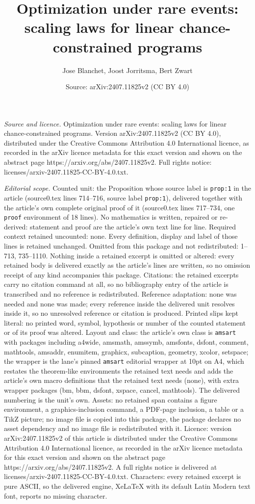 \documentclass[10pt,a4paper]{amsart}
\title[Optimization under rare events: scaling laws for linear chan]{Optimization under rare events: scaling laws for linear chance-constrained programs}
\author{Jose Blanchet, Joost Jorritsma, Bert Zwart}
\date{Source: arXiv:2407.11825v2 (CC BY 4.0)}
\begin{document}
\maketitle

\noindent\emph{Source and licence.} Optimization under rare events: scaling laws for linear chance-constrained programs. Version arXiv:2407.11825v2 (CC BY 4.0), distributed under the Creative Commons Attribution 4.0 International licence, as recorded in the arXiv licence metadata for this exact version and shown on the abstract page https://arxiv.org/abs/2407.11825v2. Full rights notice: licenses/arxiv-2407.11825-CC-BY-4.0.txt.\par\smallskip

\noindent\textit{Editorial scope.} Counted unit: the Proposition whose source label is \texttt{prop:1} in the article (source0.tex lines 714--716, source label \texttt{prop:1}), delivered together with the article's own complete original proof of it (source0.tex lines 717--734, one \texttt{proof} environment of 18 lines). No mathematics is written, repaired or re-derived: statement and proof are the article's own text line for line. Required context retained uncounted: none. Every definition, display and label of those lines is retained unchanged. Omitted from this package and not redistributed: 1--713, 735--1110. Nothing inside a retained excerpt is omitted or altered: every retained body is delivered exactly as the article's lines are written, so no omission receipt of any kind accompanies this package. Citations: the retained excerpts carry no citation command at all, so no bibliography entry of the article is transcribed and no reference is redistributed. Reference adaptation: none was needed and none was made; every reference inside the delivered unit resolves inside it, so no unresolved reference or citation is produced. Printed slips kept literal: no printed word, symbol, hypothesis or number of the counted statement or of its proof was altered. Layout and class: the article's own class is \texttt{amsart} with packages including a4wide, amsmath, amssymb, amsfonts, dsfont, comment, mathtools, amsaddr, enumitem, graphicx, subcaption, geometry, xcolor, setspace; the wrapper is the lane's pinned \texttt{amsart} editorial wrapper at 10pt on A4, which restates the theorem-like environments the retained text needs and adds the article's own macro definitions that the retained text needs (none), with extra wrapper packages (bm, bbm, dsfont, xspace, cancel, mathtools). The delivered numbering is the unit's own. Assets: no retained span contains a figure environment, a graphics-inclusion command, a PDF-page inclusion, a table or a TikZ picture; no image file is copied into this package, the package declares no asset dependency and no image file is redistributed with it. Licence: version arXiv:2407.11825v2 of this article is distributed under the Creative Commons Attribution 4.0 International licence, as recorded in the arXiv licence metadata for this exact version and shown on the abstract page https://arxiv.org/abs/2407.11825v2. A full rights notice is delivered at licenses/arxiv-2407.11825-CC-BY-4.0.txt. Characters: every retained excerpt is pure ASCII, so the delivered engine, XeLaTeX with its default Latin Modern text font, reports no missing character.
\end{document}
